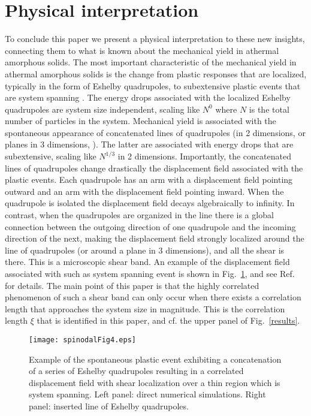 \documentclass[9pt,twocolumn,twoside]{pnas-new}
\begin{document}
\section*{Physical interpretation}

To conclude this paper we present a physical interpretation to these new insights, connecting
them to what is known about the mechanical yield in athermal amorphous solids. The most important
characteristic of the mechanical yield in athermal amorphous solids is the change from plastic
responses that are localized, typically in the form of Eshelby quadrupoles, to subextensive plastic
events that are system spanning \cite{10KLP,15HJPS}. The energy drops associated with the localized Eshelby quadrupoles are system
size independent, scaling like $N^0$ where $N$ is the total number of particles in the system.
Mechanical yield is associated with the spontaneous appearance of concatenated lines of quadrupoles
(in 2 dimensions, or planes in 3 dimensions, \cite{12DHP,13DHP,13DGMPS}). The latter are associated with energy drops that are subextensive, scaling like $N^{1/3}$ in 2 dimensions. Importantly, the concatenated lines of quadrupoles change drastically the displacement field associated with the plastic events. Each quadrupole has an arm with a displacement field pointing outward and an arm with the displacement field pointing inward.
When the quadrupole is isolated the displacement field decays algebraically to infinity. In contrast,
when the quadrupoles are organized in the line there is a global connection between the outgoing direction
of one quadrupole and the incoming direction of the next, making the displacement field strongly localized
around the line of quadrupoles (or around a plane in 3 dimensions), and all the shear is there. This is a microscopic shear band. An example of the displacement field associated with such as system spanning
event is shown in Fig.~\ref{shearband}, and see Ref.~\cite{12DHP} for details. The
main point of this paper is that the highly correlated phenomenon of such a shear band can only occur
when there exists a correlation length that approaches the system size in magnitude. This is the correlation
length $\xi$ that is identified in this paper, and cf. the upper panel of Fig.~\ref{results}.
\begin{figure}[h!]
\texttt{[image: spinodalFig4.eps]}
\caption{Example of the spontaneous plastic event exhibiting a concatenation of a series of Eshelby quadrupoles resulting in a correlated displacement field with shear localization over a thin region which is
system spanning. Left panel: direct numerical simulations. Right panel: inserted line of Eshelby quadrupoles.}
\label{shearband}
\end{figure}
\end{document}
